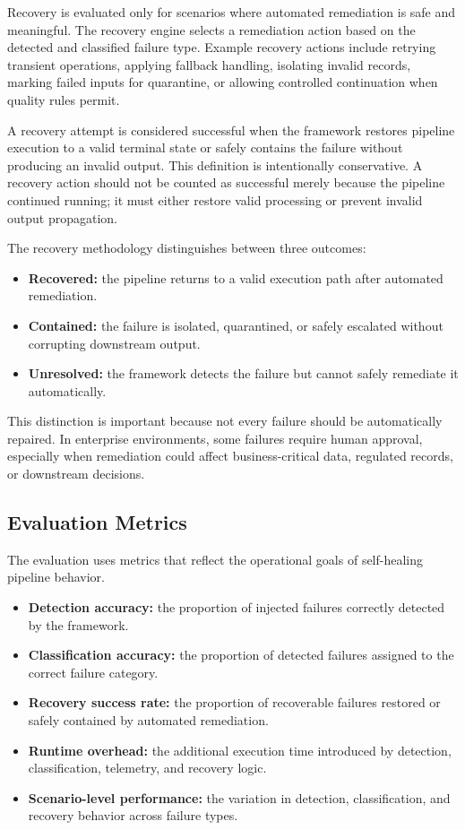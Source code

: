Recovery is evaluated only for scenarios where automated remediation is safe and meaningful. The recovery engine selects a remediation action based on the detected and classified failure type. Example recovery actions include retrying transient operations, applying fallback handling, isolating invalid records, marking failed inputs for quarantine, or allowing controlled continuation when quality rules permit.

A recovery attempt is considered successful when the framework restores pipeline execution to a valid terminal state or safely contains the failure without producing an invalid output. This definition is intentionally conservative. A recovery action should not be counted as successful merely because the pipeline continued running; it must either restore valid processing or prevent invalid output propagation.

The recovery methodology distinguishes between three outcomes:

\begin{itemize}
    \item \textbf{Recovered:} the pipeline returns to a valid execution path after automated remediation.
    \item \textbf{Contained:} the failure is isolated, quarantined, or safely escalated without corrupting downstream output.
    \item \textbf{Unresolved:} the framework detects the failure but cannot safely remediate it automatically.
\end{itemize}

This distinction is important because not every failure should be automatically repaired. In enterprise environments, some failures require human approval, especially when remediation could affect business-critical data, regulated records, or downstream decisions.

\subsection{Evaluation Metrics}

The evaluation uses metrics that reflect the operational goals of self-healing pipeline behavior.

\begin{itemize}
    \item \textbf{Detection accuracy:} the proportion of injected failures correctly detected by the framework.
    \item \textbf{Classification accuracy:} the proportion of detected failures assigned to the correct failure category.
    \item \textbf{Recovery success rate:} the proportion of recoverable failures restored or safely contained by automated remediation.
    \item \textbf{Runtime overhead:} the additional execution time introduced by detection, classification, telemetry, and recovery logic.
    \item \textbf{Scenario-level performance:} the variation in detection, classification, and recovery behavior across failure types.
\end{itemize}

